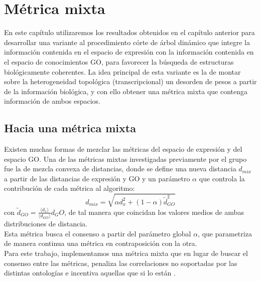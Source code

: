 \chapter{Métrica mixta}
En este capítulo utilizaremos los resultados obtenidos en el capítulo anterior para desarrollar una variante al procedimiento córte de árbol dinámico que integre la información contenida en el espacio de expresión con la información contenida en el espacio de conocimientos GO, para favorecer la búsqueda de estructuras biológicamente coherentes. La idea principal de esta variante es la de montar sobre la heterogeneidad topológica (transcripcional) un desorden de pesos a partir de la información biológica, y con ello obtener una métrica mixta que contenga información de ambos espacios.

\section{Hacia una métrica mixta}
Existen muchas formas de mezclar las métricas del espacio de expresión y del espacio GO. Una de las métricas mixtas investigadas previamente por el grupo \cite{Berenstein2010} fue la de mezcla convexa de distancias, donde se define una nueva distancia $d_{mix}$ a partir de las distancias de expresión y GO y un parámetro $\alpha$ que controla la contribución de cada métrica al algoritmo:
\begin{equation}
	d_{mix} = \sqrt{\alpha d_{x}^2 + (1-\alpha)\tilde{d}_{GO}^2}
\end{equation}
con $\tilde{d}_{GO} = \frac{\langle d_x \rangle}{\langle d_{GO} \rangle}d{_GO}$, de tal manera que coincidan los valores medios de ambas distribuciones de distancia.\\
Esta métrica busca el consenso a partir del parámetro global $\alpha$, que parametriza de manera continua una métrica en contraposición con la otra.\\
Para este trabajo, implementamos una métrica mixta que en lugar de buscar el consenso entre las métricas, penaliza las correlaciones no soportadas por las distintas ontologías e incentiva aquellas que si lo están .
